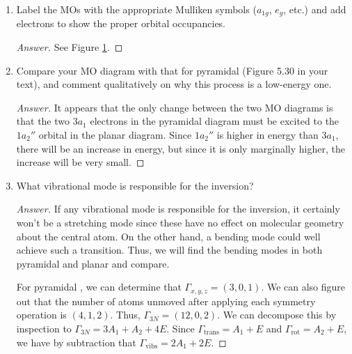 \documentclass[../psets.tex]{subfiles}
\begin{document}
\begin{enumerate}[label={\Roman*)}]
\begin{enumerate}[label={\alph*)}]
\begin{proof}[Answer]
\begin{figure}[H]
                \caption{Planar ${\ce{NH3}}^\ddagger$ orbital diagram.}
                \label{fig:orbitalDiagram-NH3-planar}
            \end{figure}
        \end{proof}
        \item Label the MOs with the appropriate Mulliken symbols ($a_{1g}$, $e_g$, etc.) and add electrons to show the proper orbital occupancies.
        \begin{proof}[Answer]
            See Figure \ref{fig:orbitalDiagram-NH3-planar}.
        \end{proof}
        \item Compare your MO diagram with that for pyramidal  (Figure 5.30 in your text), and comment qualitatively on why this process is a low-energy one.
        \begin{proof}[Answer]
            It appears that the only change between the two MO diagrams is that the two $3a_1$ electrons in the pyramidal  diagram must be excited to the $1a_2''$ orbital in the planar  diagram. Since $1a_2''$ is higher in energy than $3a_1$, there will be an increase in energy, but since it is only marginally higher, the increase will be very small.
        \end{proof}
        \item What vibrational mode is responsible for the inversion?
        \begin{proof}[Answer]
            If any vibrational mode is responsible for the inversion, it certainly won't be a stretching mode since these have no effect on molecular geometry about the central atom. On the other hand, a bending mode could well achieve such a transition. Thus, we will find the bending modes in both pyramidal and planar  and compare.\par\medskip
            For pyramidal , we can determine that $\Gamma_{x,y,z}=(3,0,1)$. We can also figure out that the number of atoms unmoved after applying each symmetry operation is $(4,1,2)$. Thus, $\Gamma_{3N}=(12,0,2)$. We can decompose this by inspection to $\Gamma_{3N}=3A_1+A_2+4E$. Since $\Gamma_\text{trans}=A_1+E$ and $\Gamma_\text{rot}=A_2+E$, we have by subtraction that $\Gamma_\text{vibs}=2A_1+2E$.\par

\end{proof}
\end{enumerate}
\end{enumerate}
\end{document}
